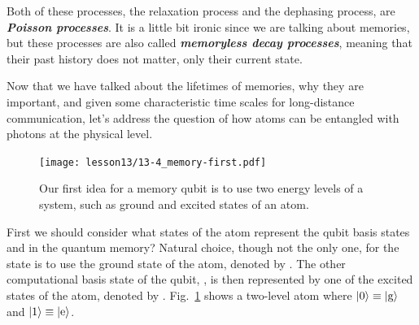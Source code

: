 Both of these processes, the relaxation process and the dephasing process, are \textbf{\emph{Poisson processes}}.
It is a little bit ironic since we are talking about memories, but these processes are also called \textbf{\emph{memoryless decay processes}}, meaning that their past history does not matter, only their current state.

Now that we have talked about the lifetimes of memories, why they are important, and given some characteristic time scales for long-distance communication, let's address the question of how atoms can be entangled with photons at the physical level.

\begin{figure}[t]
    \centering
    \texttt{[image: lesson13/13-4\_memory-first.pdf]}
    \caption[First idea for memory.]{Our first idea for a memory qubit is to use two energy levels of a system, such as ground and excited states of an atom.}
    \label{fig:13-memory-first}
\end{figure}

First we should consider what states of the atom represent the qubit basis states  and  in the quantum memory?
Natural choice, though not the only one, for the state  is to use the ground state of the atom, denoted by .
The other computational basis state of the qubit, , is then represented by one of the excited states of the atom, denoted by .
Fig.~\ref{fig:13-memory-first} shows a two-level atom where $\left| 0 \right\rangle\equiv\left| \textrm{g} \right\rangle$ and $\left| 1 \right\rangle\equiv\left| \textrm{e} \right\rangle$.


